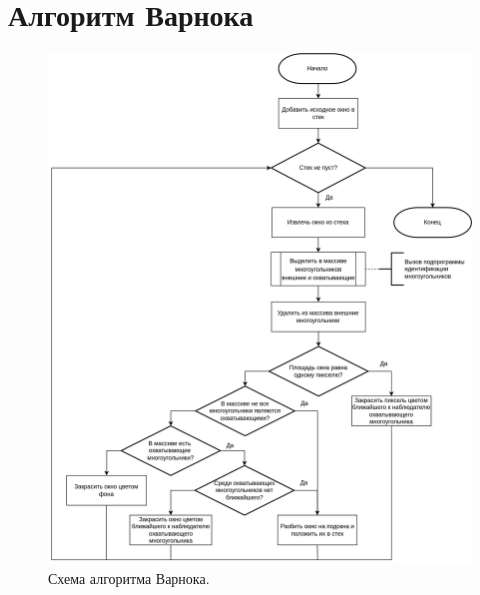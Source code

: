 \chapter{Алгоритм Варнока}
\label{cha:appendix2}

\begin{figure}[h]
	\centering
	\includegraphics[scale=0.1725 ]{img/flowchart/subdivide3.png}
	\caption{Схема алгоритма Варнока.}
	\label{fig:warnock_algorithm}
\end{figure} 

